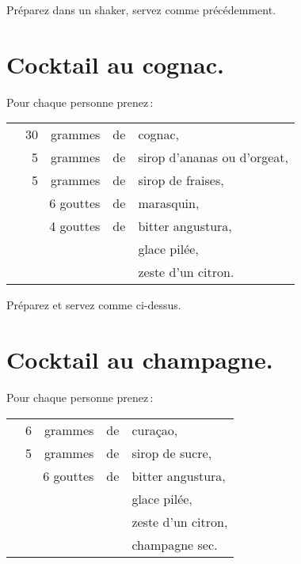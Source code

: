 Préparez dans un shaker, servez comme précédemment.

\section*{\centering Cocktail au cognac.}
{}

Pour chaque personne prenez :

\footnotesize
\begin{longtable}{rrrrp{16em}}
  & 30 & grammes & de & cognac,                                                                           \\
  &  5 & grammes & de & sirop d'ananas ou d'orgeat,                                                       \\
  &  5 & grammes & de & sirop de fraises,                                                                 \\
  & \multicolumn{2}{r}{6 gouttes} & de & marasquin,                                                       \\
  & \multicolumn{2}{r}{4 gouttes} & de & bitter angustura,                                                \\
  &    &         &    & glace pilée,                                                                      \\
  &    &         &    & zeste d'un citron.                                                                \\
\end{longtable}
\normalsize

Préparez et servez comme ci-dessus.

\section*{\centering Cocktail au champagne.}
{}

Pour chaque personne prenez :

\footnotesize
\begin{longtable}{rrrrp{16em}}
  &  6 & grammes & de & curaçao,                                                                          \\
  &  5 & grammes & de & sirop de sucre,                                                                   \\
  & \multicolumn{2}{r}{6 gouttes} & de & bitter angustura,                                                \\
  &    &         &    & glace pilée,                                                                      \\
  &    &         &    & zeste d'un citron,                                                                \\
  &    &         &    & champagne sec.                                                                    \\
\end{longtable}
\normalsize

